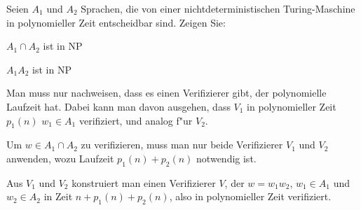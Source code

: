 Seien $A_1$ und $A_2$ Sprachen, die von einer nichtdeterministischen
Turing-Maschine in polynomieller Zeit entscheidbar sind. Zeigen Sie:
\begin{teilaufgaben}
\item $A_1\cap A_2$ ist in NP
\item $A_1A_2$ ist in NP
\end{teilaufgaben}

\begin{loesung}
Man muss nur nachweisen, dass es einen Verifizierer gibt, der polynomielle
Laufzeit hat. Dabei kann man davon ausgehen, dass $V_1$ in polynomieller
Zeit $p_1(n)$ $w_1\in A_1$ verifiziert, und analog f"ur $V_2$.
\begin{teilaufgaben}
\item
Um $w\in A_1\cap A_2$ zu verifizieren, muss man nur beide Verifizierer
$V_1$ und $V_2$ anwenden, wozu Laufzeit $p_1(n)+p_2(n)$ notwendig ist.
\item
Aus $V_1$ und $V_2$
konstruiert man einen Verifizierer $V$,
der $w=w_1w_2$, $w_1\in A_1$ und $w_2\in A_2$ in Zeit
$n + p_1(n) + p_2(n)$, also in polynomieller Zeit verifiziert.
\end{teilaufgaben}
\end{loesung}
